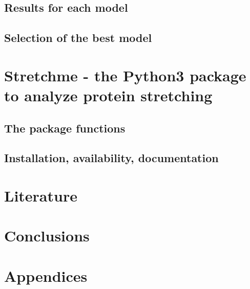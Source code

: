 \documentclass[11pt]{article}
\begin{document}
\subsection*{Results for each model}
\label{subsec:theory_results}

\subsection*{Selection of the best model}
\label{subsec:theory_best}

\section{Stretchme - the Python3 package to analyze protein stretching}
\label{sec:stretchme}
\subsection*{The package functions}
\label{subsec:stretchme_functions}

\subsection*{Installation, availability, documentation}
\label{subsec:stretchme_documentation}

\section{Literature}
\label{sec:literature}


\section{Conclusions}
\label{sec:conclusions}


\section*{Appendices}
\label{sec:app}
\end{document}
